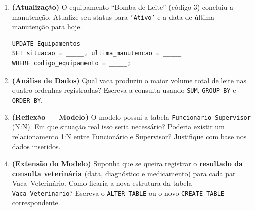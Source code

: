 \documentclass[12pt]{article}
\begin{document}
\begin{enumerate}[label=\textbf{Ex.\,\arabic*:}, leftmargin=*]
  \begin{resposta}
  \end{resposta}

  \vspace{0.4cm}

  \item \textbf{(Atualização)} O equipamento ``Bomba de Leite'' (código 3)
  concluiu a manutenção. Atualize seu status para \texttt{'Ativo'} e a data
  de última manutenção para hoje.

  \begin{lstlisting}[caption={Modelo UPDATE --- complete}]
UPDATE Equipamentos
SET situacao = _____, ultima_manutencao = _____
WHERE codigo_equipamento = _____;
  \end{lstlisting}

  \begin{resposta}
  \end{resposta}

  \vspace{0.4cm}

  \item \textbf{(Análise de Dados)} Qual vaca produziu o maior volume total de
  leite nas quatro ordenhas registradas? Escreva a consulta usando \texttt{SUM},
  \texttt{GROUP BY} e \texttt{ORDER BY}.

  \begin{resposta}
  \end{resposta}

  \vspace{0.4cm}

  \item \textbf{(Reflexão --- Modelo)} O modelo possui a tabela
  \texttt{Funcionario\_Supervisor} (N:N). Em que situação real isso seria
  necessário? Poderia existir um relacionamento 1:N entre Funcionário e
  Supervisor? Justifique com base nos dados inseridos.

  \begin{resposta}
  \end{resposta}

  \vspace{0.4cm}

  \item \textbf{(Extensão do Modelo)} Suponha que se queira registrar o
  \textbf{resultado da consulta veterinária} (data, diagnóstico e medicamento)
  para cada par Vaca--Veterinário. Como ficaria a nova estrutura da tabela
  \texttt{Vaca\_Veterinario}? Escreva o \texttt{ALTER TABLE} ou o novo
  \texttt{CREATE TABLE} correspondente.

  \begin{resposta}
  \end{resposta}

\end{enumerate}
\end{document}
